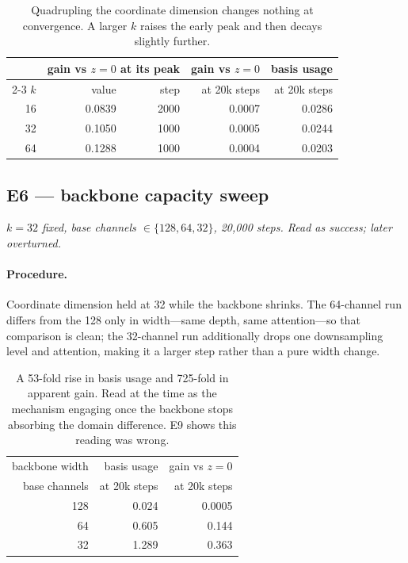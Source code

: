 \documentclass[11pt]{article}
\begin{document}
\begin{table}[htbp]
\centering\small
\begin{tabular}{@{}rrrrr@{}}
\toprule
& \multicolumn{2}{c}{gain vs $z=0$ at its peak} & gain vs $z=0$ & basis usage \\
\cmidrule(lr){2-3}
$k$ & value & step & at 20k steps & at 20k steps \\
\midrule
16 & 0.0839 & 2000 & 0.0007 & 0.0286 \\
32 & 0.1050 & 1000 & 0.0005 & 0.0244 \\
64 & 0.1288 & 1000 & 0.0004 & 0.0203 \\
\bottomrule
\end{tabular}
\caption{Quadrupling the coordinate dimension changes nothing at convergence. A larger $k$ raises
the early peak and then decays slightly further.}
\end{table}

\subsection{E6 --- backbone capacity sweep}

\textit{$k=32$ fixed, base channels $\in\{128,64,32\}$, 20{,}000 steps. Read as success; later
overturned.}

\paragraph{Procedure.} Coordinate dimension held at 32 while the backbone shrinks. The 64-channel
run differs from the 128 only in width---same depth, same attention---so that comparison is clean;
the 32-channel run additionally drops one downsampling level and attention, making it a larger step
rather than a pure width change.

\begin{table}[htbp]
\centering\small
\begin{tabular}{@{}rrr@{}}
\toprule
backbone width & basis usage & gain vs $z=0$ \\
base channels & at 20k steps & at 20k steps \\
\midrule
128 & 0.024 & 0.0005 \\
 64 & 0.605 & 0.144 \\
 32 & 1.289 & 0.363 \\
\bottomrule
\end{tabular}
\caption{A 53-fold rise in basis usage and 725-fold in apparent gain. Read at the time as the
mechanism engaging once the backbone stops absorbing the domain difference. E9 shows this reading
was wrong.}
\end{table}
\end{document}
